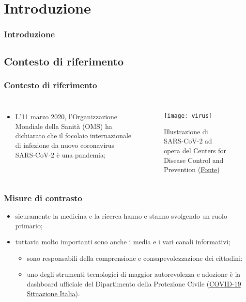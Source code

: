 \documentclass[../../main.tex]{subfiles}
\begin{document}
\section{Introduzione}

\begin{frame}
    \frametitle{Introduzione}
\end{frame}

\subsection{Contesto di riferimento}
\begin{frame}
    \frametitle{Contesto di riferimento}
    
    \begin{columns}
        
        \begin{itemize}
            \item L'11 marzo 2020, l'Organizzazione Mondiale della Sanità (OMS) ha dichiarato che il focolaio internazionale di infezione da nuovo coronavirus SARS-CoV-2 è una pandemia; 
        \end{itemize}

        \begin{figure}
            \texttt{[image: virus]}
            \caption{Illustrazione di SARS-CoV-2 ad opera del Centers for Disease Control and Prevention (\href{https://phil.cdc.gov/Details.aspx?pid=23312}{Fonte})}
        \end{figure}
        
    \end{columns}

\end{frame}

\begin{frame}
    \frametitle{Misure di contrasto}

    \begin{itemize}
        \item<1-> sicuramente la medicina e la ricerca hanno e stanno svolgendo
        un ruolo primario;
        \item<2-> tuttavia molto importanti sono anche i media e i vari canali informativi;
        \begin{itemize}
            \item sono responsabili della comprensione e \alert{consapevolezzazione dei cittadini};
            \item uno degli strumenti tecnologici di maggior autorevolezza e adozione è la dashboard ufficiale del Dipartimento della Protezione Civile (\href{https://opendatadpc.maps.arcgis.com/apps/opsdashboard/index.html\#/b0c68bce2cce478eaac82fe38d4138b1}{COVID-19 Situazione Italia}).
        \end{itemize}              

    \end{itemize}

\end{frame}
\end{document}
